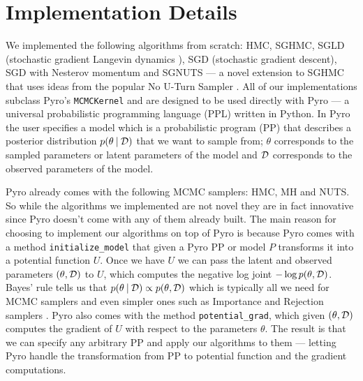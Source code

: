 

\section{Implementation Details}

We implemented the following algorithms from scratch: HMC, SGHMC, SGLD (stochastic gradient Langevin dynamics \cite{sgld}), SGD (stochastic gradient descent), SGD with Nesterov momentum and SGNUTS — a novel extension to SGHMC that uses ideas from the popular No U-Turn Sampler \cite{nuts}. All of our implementations subclass Pyro's \texttt{MCMCKernel} and are designed to be used directly with Pyro \cite{pyro} — a universal probabilistic programming language (PPL) written in Python. In Pyro the user specifies a model which is a probabilistic program (PP) that describes a posterior distribution $p(\theta \: | \: \mathcal{D})$ that we want to sample from; $\theta$ corresponds to the sampled parameters or latent parameters of the model and $\mathcal{D}$ corresponds to the observed parameters of the model. 

Pyro already comes with the following MCMC samplers: HMC, MH and NUTS. So while the algorithms we implemented are not novel they are in fact innovative since Pyro doesn't come with any of them already built. The main reason for choosing to implement our algorithms on top of Pyro is because Pyro comes with a method \texttt{initialize\_model} that given a Pyro PP or model $P$ transforms it into a potential function $U$. Once we have $U$ we can pass the latent and observed parameters $(\theta, \mathcal{D})$ to $U$, which computes the negative log joint $- \log p(\theta, \mathcal{D})$. Bayes' rule tells us that  $p(\theta \: | \: \mathcal{D}) \propto p(\theta, \mathcal{D})$ which is typically all we need for MCMC samplers and even simpler ones such as Importance and Rejection samplers \cite{bishop2006pattern}. Pyro also comes with the method \texttt{potential\_grad}, which given $(\theta, \mathcal{D})$ computes the gradient of $U$ with respect to the parameters $\theta$. The result is that we can specify any arbitrary PP and apply our algorithms to them — letting Pyro handle the transformation from PP to potential function and the gradient computations.

